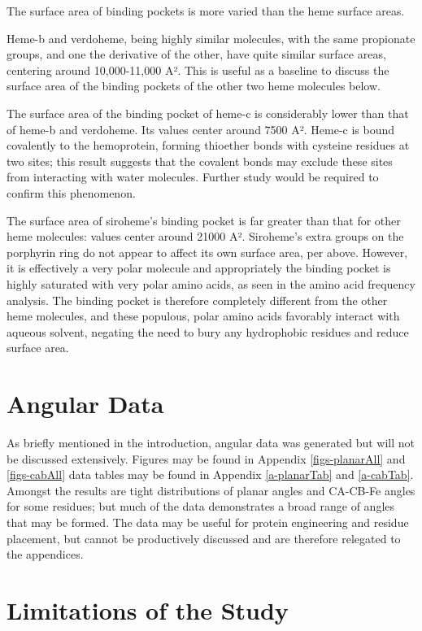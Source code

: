 \documentclass[a4paper, nobind]{templates/ociamthesis}
\begin{document}
The surface area of binding pockets is more varied than the heme surface areas.

Heme-b and verdoheme, being highly similar molecules, with the same propionate groups, and one the derivative of the other, have quite similar surface areas, centering around 10,000-11,000 A². This is useful as a baseline to discuss the surface area of the binding pockets of the other two heme molecules below.

The surface area of the binding pocket of heme-c is considerably lower than that of heme-b and verdoheme. Its values center around 7500 A². Heme-c is bound covalently to the hemoprotein, forming thioether bonds with cysteine residues at two sites; this result suggests that the covalent bonds may exclude these sites from interacting with water molecules. Further study would be required to confirm this phenomenon.

The surface area of siroheme's binding pocket is far greater than that for other heme molecules: values center around 21000 A². Siroheme's extra groups on the porphyrin ring do not appear to affect its own surface area, per above. However, it is effectively a very polar molecule and appropriately the binding pocket is highly saturated with very polar amino acids, as seen in the amino acid frequency analysis. The binding pocket is therefore completely different from the other heme molecules, and these populous, polar amino acids favorably interact with aqueous solvent, negating the need to bury any hydrophobic residues and reduce surface area.

\hypertarget{angular-data}{%
\section{Angular Data}\label{angular-data}}

As briefly mentioned in the introduction, angular data was generated but will not be discussed extensively. Figures may be found in Appendix \ref{figs-planarAll} and \ref{figs-cabAll} data tables may be found in Appendix \ref{a-planarTab} and \ref{a-cabTab}. Amongst the results are tight distributions of planar angles and CA-CB-Fe angles for some residues; but much of the data demonstrates a broad range of angles that may be formed. The data may be useful for protein engineering and residue placement, but cannot be productively discussed and are therefore relegated to the appendices.

\hypertarget{limitations-of-the-study}{%
\section{Limitations of the Study}\label{limitations-of-the-study}}
\end{document}
